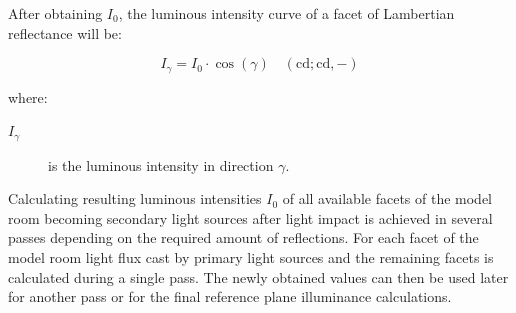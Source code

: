 After obtaining $I_{0}$, the luminous intensity curve of a facet of Lambertian reflectance will be:

\begin{equation}
I_{\gamma}=I_{0} \cdot \cos(\gamma) \quad \mathrm{(cd;cd,-)}
\label{eq:Igamma}
\end{equation}

where:
\begin{description}
	\item[$I_{\gamma}$] is the luminous intensity in direction $\gamma$.
\end{description}

Calculating resulting luminous intensities $I_{0}$ of all available facets of the model room becoming secondary light sources after light impact is achieved in several passes depending on the required amount of reflections. For each facet of the model room light flux cast by primary light sources and the remaining facets is calculated during a single pass. The newly obtained values can then be used later for another pass or for the final reference plane illuminance calculations.

%
